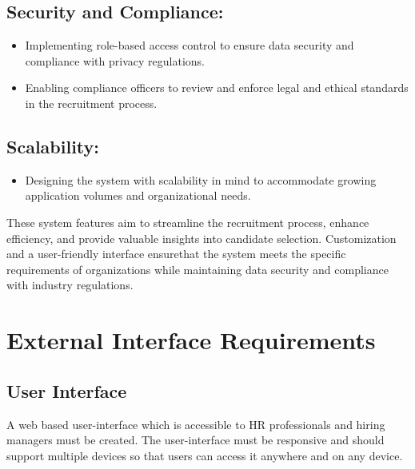 \subsection{Security and Compliance:}
\begin{itemize}
	\item Implementing role-based access control to ensure data security and compliance with privacy regulations.
	\item  Enabling compliance officers to review and enforce legal and ethical standards in the recruitment process.
\end{itemize}

\subsection{Scalability:}
\begin{itemize}
	\item Designing the system with scalability in mind to accommodate growing application volumes and organizational needs.
\end{itemize}

These system features aim to streamline the recruitment process, enhance efficiency, and provide valuable insights into candidate selection. Customization and a user-friendly interface ensurethat the system meets the specific requirements of organizations while maintaining data security and compliance with industry regulations.


\section{External Interface Requirements}
\subsection{User Interface}
A web based user-interface which is accessible to HR professionals and hiring managers must be created. The user-interface must be responsive and should support multiple devices so that users can access it anywhere and on any device.

